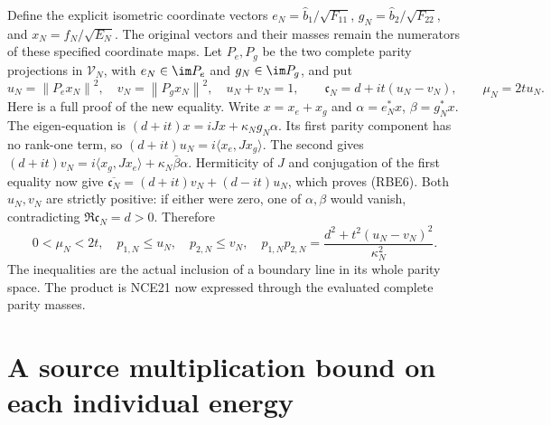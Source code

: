\documentclass[11pt]{article}
\newcommand{\norm}[1]{\left\lVert#1\right\rVert}
\begin{document}
Define the explicit isometric coordinate vectors
\(e_N=\widehat b_1/\sqrt{F_{11}}\),
\(g_N=\widehat b_2/\sqrt{F_{22}}\), and
\(x_N=f_N/\sqrt{E_N}\). The original vectors and their masses
remain the numerators of these specified coordinate maps.
Let \(P_e,P_g\) be the two complete parity projections in
\(\mathcal V_N\), with \(e_N\in\im P_e\) and
\(g_N\in\im P_g\), and put
\begin{equation}\tag{RBE6}
 u_N=\norm{P_ex_N}^2,\quad v_N=\norm{P_gx_N}^2,\quad
 u_N+v_N=1,\qquad
 \mathfrak c_N=d+it(u_N-v_N),\qquad \mu_N=2tu_N.
\end{equation}
Here is a full proof of the new equality. Write \(x=x_e+x_g\)
and \(\alpha=e_N^*x\), \(\beta=g_N^*x\).
The eigen-equation is
\((d+it)x=iJx+\kappa_Ng_N\alpha\). Its first parity component
has no rank-one term, so
\((d+it)u_N=i\langle x_e,Jx_g\rangle\).
The second gives
\((d+it)v_N=i\langle x_g,Jx_e\rangle+
\kappa_N\bar\beta\alpha\).
Hermiticity of \(J\) and conjugation of the first equality now
give \(\overline{\mathfrak c_N}=(d+it)v_N+(d-it)u_N\),
which proves (RBE6). Both \(u_N,v_N\) are strictly positive:
if either were zero, one of \(\alpha,\beta\) would vanish,
contradicting \(\Re\mathfrak c_N=d>0\).
Therefore
\begin{equation}\tag{RBE7}
 0<\mu_N<2t,\quad
 p_{1,N}\le u_N,\quad p_{2,N}\le v_N,\quad
 p_{1,N}p_{2,N}=\frac{d^2+t^2(u_N-v_N)^2}{\kappa_N^2}.
\end{equation}
The inequalities are the actual inclusion of a boundary line in
its whole parity space. The product is NCE21 now expressed through
the evaluated complete parity masses.

\section{A source multiplication bound on each individual energy}
\end{document}
